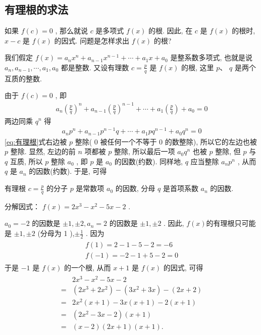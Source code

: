 \subsection{有理根的求法}
如果 $f(c)=0$ , 那么就说 $c$ 是多项式 $f(x)$ 的根. 因此, 在 $c$ 是 $f(x)$ 的根时,  $x-c$ 是 $f(x)$ 的因式. 问题是怎样求出 $f(x)$ 的根?

我们假定 $f(x)=a_{n} x^{n}+a_{n-1} x^{n-1}+\cdots+a_{1} x+a_{0}$ 是整系数多项式, 也就是说 $a_{n}, a_{n-1}, \cdots, a_{1}, a_{0}$ 都是整数. 又设有理数 $c=\frac{p}{q}$ 是 $f(x)$ 的根, 这里 $p 、$ $q$ 是两个互质的整数.

由于 $f(c)=0$ , 即
\begin{align*}
	a_{n}\left(\frac{p}{q}\right)^{n}+a_{n-1}\left(\frac{p}{q}\right)^{n-1}+\cdots+a_{1}\left(\frac{p}{q}\right)+a_{0}=0
\end{align*}
两边同乘 $q^{n}$ 得
\begin{align}\label{eq:有理根}
	a_{n} p^{n}+a_{n-1} p^{n-1} q+\cdots+a_{1} p q^{n-1}+a_{0} q^{n}=0
\end{align}
\ref{eq:有理根}式右边被 $p$ 整除( 0 被任何一个不等于 0 的数整除), 所以它的左边也被 $p$ 整除. 显然, 左边的前 $n$ 项都被 $p$ 整除, 所以最后一项 $a_{0} q^{n}$ 也被 $p$ 整除, 但 $p$ 与 $q$ 互质, 所以 $p$ 整除 $a_{0}$ , 即 $p$ 是 $a_{0}$ 的因数(约数). 同样地,  $q$ 应当整除 $a_{n} p^{n}$ , 从而 $q$ 是 $a_{n}$ 的因数(约数). 于是, 可得

有理根 $c=\frac{p}{q}$ 的分子 $p$ 是常数项 $a_{0}$ 的因数, 分母 $q$ 是首项系数 $a_{n}$ 的因数.

\begin{example}
	分解因式： $f(x)=2 x^{3}-x^{2}-5 x-2$ . 
\end{example}
\begin{solution}
	$a_{0}=-2$ 的因数是 $\pm 1, \pm 2, a_{n}=2$ 的因数是 $\pm 1, \pm 2$ . 因此,  $f(x)$的有理根只可能是 $\pm 1, \pm 2$ (分母为 1 ),$\pm \frac{1}{2}$ . 因为
	\begin{align*}
		\begin{gathered}
			f(1)=2-1-5-2=-6 \\
			f(-1)=-2-1+5-2=0
		\end{gathered}
	\end{align*}
	于是 $-1$ 是 $f(x)$ 的一个根, 从而 $x+1$ 是 $f(x)$ 的因式, 可得
	\begin{align*}
		\begin{aligned}
			  & 2 x^{3}-x^{2}-5 x-2                                           \\
			= & \left(2 x^{3}+2 x^{2}\right)-\left(3 x^{2}+3 x\right)-(2 x+2) \\
			= & 2 x^{2}(x+1)-3 x(x+1)-2(x+1)                                  \\
			= & \left(2 x^{2}-3 x-2\right)(x+1)                               \\
			= & (x-2)(2 x+1)(x+1) .
		\end{aligned}
	\end{align*}
\end{solution}


